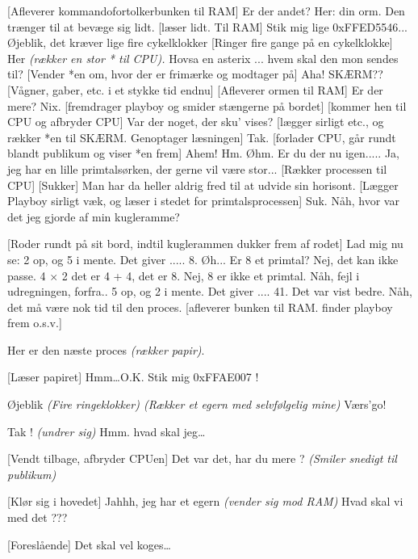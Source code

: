 \documentclass{article}
\begin{document}
\begin{sketch}
[Afleverer kommandofortolkerbunken til RAM] Er der andet?
 Her: din orm. Den trænger til at bevæge sig lidt.
[læser lidt. Til RAM] Stik mig lige 0xFFED5546...
 Øjeblik, det kræver lige fire cykelklokker 
[Ringer fire gange på en cykelklokke] Her {\em (rækker
en stor * til CPU).}
 Hovsa en asterix ... hvem skal den mon sendes til?
[Vender *en om, hvor der er frimærke og modtager på] Aha! SKÆRM??
[Vågner, gaber, etc. i et stykke tid endnu]
[Afleverer ormen til RAM] Er der mere?
 Nix.
[fremdrager playboy og smider stængerne på bordet]
[kommer hen til CPU og afbryder CPU] Var der noget,
      der sku' vises?
[lægger sirligt etc., og rækker *en til SKÆRM.
Genoptager læsningen] 
 Tak. 
[forlader CPU, går rundt blandt publikum og viser
      *en frem]
 Ahem! Hm. Øhm. 
 Er du der nu igen.....
 Ja, jeg har en lille primtalsørken, der gerne vil være stor...
[Rækker processen til CPU]
[Sukker] Man har da heller aldrig fred til at udvide sin horisont.
[Lægger Playboy sirligt væk, og læser i stedet for
primtalsprocessen] Suk. Nåh, hvor var det jeg gjorde af min kugleramme?

[Roder rundt på sit bord, indtil kuglerammen dukker frem
af rodet] Lad mig nu se: 2 op, og 5 i mente. Det giver ..... 8.
Øh...  Er 8 et primtal? Nej, det kan ikke passe. 4 $\times$ 2 det
er 4 + 4, det er 8. Nej, 8 er ikke et primtal. Nåh, fejl i
udregningen, forfra.. 5 op, og 2 i mente. Det giver .... 41. Det
var vist bedre.  Nåh, det må være nok tid til den proces.
[afleverer bunken til RAM. finder playboy frem o.s.v.]

 Her er den næste proces {\em(rækker papir)}.

[Læser papiret] Hmm\ldots O.K. Stik mig 0xFFAE007 !

 Øjeblik {\em(Fire ringeklokker) (Rækker et egern med
  selvfølgelig mine)} Værs'go!

 Tak ! {\em (undrer sig)} Hmm.  hvad skal jeg\ldots

[Vendt tilbage, afbryder CPUen] Det var det, har du mere
? {\em(Smiler snedigt til publikum)}

[Klør sig i hovedet] Jahhh, jeg har et egern {\em(vender sig
mod RAM)} Hvad skal vi med det ???

[Foreslående] Det skal vel koges\ldots


\end{sketch}
\end{document}
